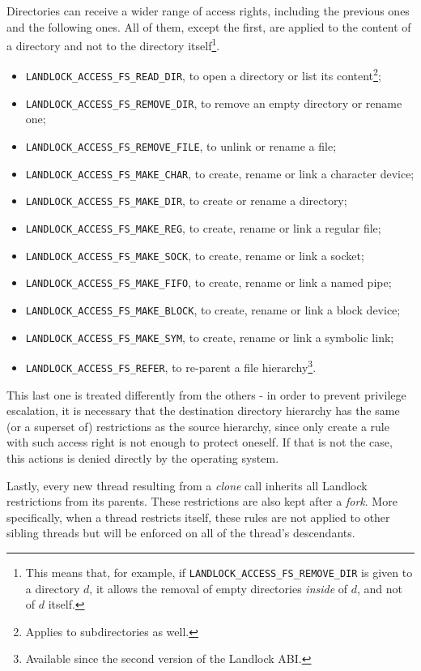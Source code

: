 Directories can receive a wider range of access rights, including the previous ones and the following ones.
All of them, except the first, are applied to the content of a directory and not to the directory
itself\footnote{This means that, for example, if \texttt{LANDLOCK\_ACCESS\_FS\_REMOVE\_DIR} is given to a directory $d$, it
allows the removal of empty directories \textit{inside} of $d$, and not of $d$ itself.}.
\begin{itemize}
  \item \texttt{LANDLOCK\_ACCESS\_FS\_READ\_DIR}, to open a directory or list its content\footnote{Applies to subdirectories as well.};
  \item \texttt{LANDLOCK\_ACCESS\_FS\_REMOVE\_DIR}, to remove an empty directory or rename one;
  \item \texttt{LANDLOCK\_ACCESS\_FS\_REMOVE\_FILE}, to unlink or rename a file;
  \item \texttt{LANDLOCK\_ACCESS\_FS\_MAKE\_CHAR}, to create, rename or link a character device;
  \item \texttt{LANDLOCK\_ACCESS\_FS\_MAKE\_DIR}, to create or rename a directory;
  \item \texttt{LANDLOCK\_ACCESS\_FS\_MAKE\_REG}, to create, rename or link a regular file;
  \item \texttt{LANDLOCK\_ACCESS\_FS\_MAKE\_SOCK}, to create, rename or link a socket;
  \item \texttt{LANDLOCK\_ACCESS\_FS\_MAKE\_FIFO}, to create, rename or link a named pipe;
  \item \texttt{LANDLOCK\_ACCESS\_FS\_MAKE\_BLOCK}, to create, rename or link a block device;
  \item \texttt{LANDLOCK\_ACCESS\_FS\_MAKE\_SYM}, to create, rename or link a symbolic link;
  \item \texttt{LANDLOCK\_ACCESS\_FS\_REFER}, to re-parent a file hierarchy\footnote{Available since the second version of the Landlock ABI.}.
\end{itemize}

This last one is treated differently from the others - in order to prevent privilege escalation,
it is necessary that the destination directory hierarchy has the same (or a superset of) restrictions
as the source hierarchy, since only create a rule with such access right is not enough to protect oneself.
If that is not the case, this actions is denied directly by the operating system.

Lastly, every new thread resulting from a \textit{clone} call inherits all Landlock restrictions from its parents.
These restrictions are also kept after a \textit{fork}.
More specifically, when a thread restricts itself, these rules are not applied to other sibling threads
but will be enforced on all of the thread's descendants.

